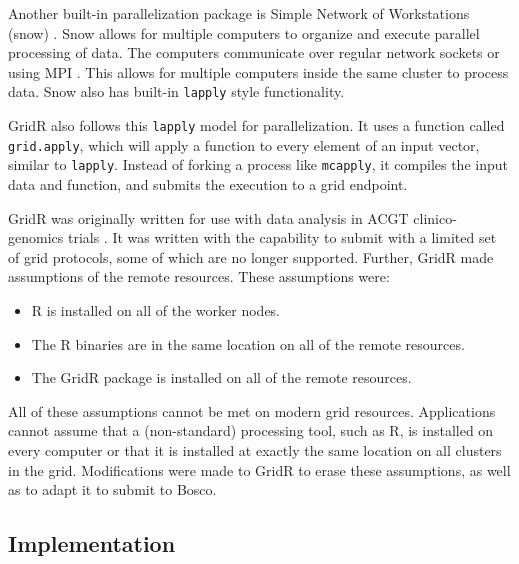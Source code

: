 Another built-in parallelization package is Simple Network of Workstations (snow) \cite{rlangsnow}.  Snow allows for multiple computers to organize and execute parallel processing of data.  The computers communicate over regular network sockets or using MPI \cite{gropp1999using}.  This allows for multiple computers inside the same cluster to process data.  Snow also has built-in \texttt{lapply} style functionality.

GridR also follows this \texttt{lapply} model for parallelization.  It uses a function called \texttt{grid.apply}, which will apply a function to every element of an input vector, similar to \texttt{lapply}.  Instead of forking a process like \texttt{mcapply}, it compiles the input data and function, and submits the execution to a grid endpoint.

GridR was originally written for use with data analysis in ACGT clinico-genomics trials \cite{wegener2007gridr}.  It was written with the capability to submit with a limited set of grid protocols, some of which are no longer supported.  Further, GridR made assumptions of the remote resources.  These assumptions were:

\begin{itemize}
\item R is installed on all of the worker nodes.
\item The R binaries are in the same location on all of the remote resources.
\item The GridR package is installed on all of the remote resources.
\end{itemize}

All of these assumptions cannot be met on modern grid resources.  Applications cannot assume that a (non-standard) processing tool, such as R, is installed on every computer or   that it is installed at exactly the same location on all clusters in the grid.  Modifications were made to GridR to erase these assumptions, as well as to adapt it to submit to Bosco.

\subsection{Implementation}
\label{sec:boscorimplementation}


